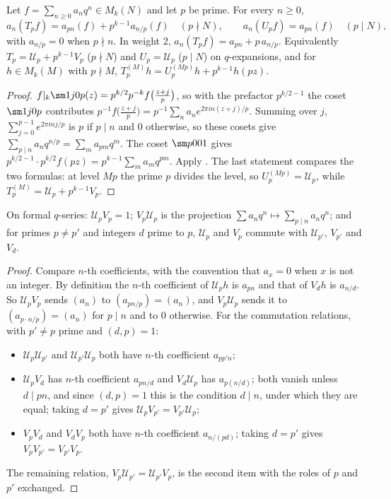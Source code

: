 \begin{proposition}[$q$-expansions]\label{prop:hecke:Tp-q-expansion}
Let $f=\sum_{n\ge0}a_nq^n\in M_k(N)$ and let $p$ be prime. For every $n\ge0$,
\[
a_n(T_pf)=a_{pn}(f)+p^{k-1}a_{n/p}(f)\quad(p\nmid N),\qquad a_n(U_pf)=a_{pn}(f)\quad(p\mid N),
\]
with $a_{n/p}=0$ when $p\nmid n$. In weight $2$, $a_n(T_pf)=a_{pn}+p\,a_{n/p}$. Equivalently $T_p=\mathcal U_p+p^{k-1}V_p$ ($p\nmid N$) and $U_p=\mathcal U_p$ ($p\mid N$) on $q$-expansions, and
for $h\in M_k(M)$ with $p\nmid M$, $T_p^{(M)}h=U_p^{(Mp)}h+p^{k-1}h(pz)$.
\end{proposition}

\begin{proof}
$f|_k\sm1j0p(z)=p^{k/2}p^{-k}f\bigl(\frac{z+j}p\bigr)$, so with the prefactor $p^{k/2-1}$ the coset $\sm1j0p$ contributes $p^{-1}f\bigl(\frac{z+j}p\bigr)=p^{-1}\sum_na_ne^{2\pi in(z+j)/p}$. Summing over
$j$, $\sum_{j=0}^{p-1}e^{2\pi inj/p}$ is $p$ if $p\mid n$ and $0$ otherwise, so these cosets give $\sum_{p\mid n}a_nq^{n/p}=\sum_ma_{pm}q^m$. The coset $\sm p001$ gives
$p^{k/2-1}\cdot p^{k/2}f(pz)=p^{k-1}\sum_ma_mq^{pm}$. Apply . The last statement compares the two formulas: at level $Mp$ the prime $p$
divides the level, so $U_p^{(Mp)}=\mathcal U_p$, while $T_p^{(M)}=\mathcal U_p+p^{k-1}V_p$.
\end{proof}

\begin{lemma}\label{lem:hecke:UV}
On formal $q$-series: $\mathcal U_pV_p=1$; $V_p\mathcal U_p$ is the projection $\sum a_nq^n\mapsto\sum_{p\mid n}a_nq^n$; and for primes $p\ne p'$ and integers $d$ prime to $p$, $\mathcal U_p$ and $V_p$ commute
with $\mathcal U_{p'}$, $V_{p'}$ and $V_d$.
\end{lemma}

\begin{proof}
Compare $n$-th coefficients, with the convention that $a_x=0$ when $x$ is not an integer. By definition the $n$-th coefficient of $\mathcal U_ph$ is $a_{pn}$ and that of
$V_dh$ is $a_{n/d}$. So $\mathcal U_pV_p$ sends $(a_n)$ to $(a_{pn/p})=(a_n)$, and $V_p\mathcal U_p$ sends it to $(a_{p\cdot n/p})=(a_n)$ for $p\mid n$ and to $0$ otherwise. For the
commutation relations, with $p'\ne p$ prime and $(d,p)=1$:
\begin{itemize}
\item $\mathcal U_p\mathcal U_{p'}$ and $\mathcal U_{p'}\mathcal U_p$ both have $n$-th coefficient $a_{pp'n}$;
\item $\mathcal U_pV_d$ has $n$-th coefficient $a_{pn/d}$ and $V_d\mathcal U_p$ has $a_{p(n/d)}$; both vanish unless $d\mid pn$, and since $(d,p)=1$ this is the condition
$d\mid n$, under which they are equal; taking $d=p'$ gives $\mathcal U_pV_{p'}=V_{p'}\mathcal U_p$;
\item $V_pV_d$ and $V_dV_p$ both have $n$-th coefficient $a_{n/(pd)}$; taking $d=p'$ gives $V_pV_{p'}=V_{p'}V_p$.
\end{itemize}
The remaining relation, $V_p\mathcal U_{p'}=\mathcal U_{p'}V_p$, is the second item with the roles of $p$ and $p'$ exchanged.
\end{proof}

